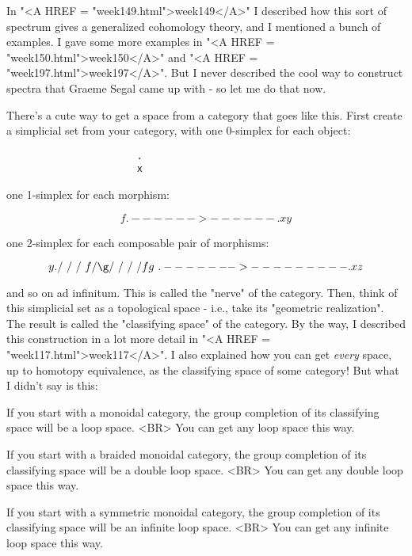 In "<A HREF = "week149.html">week149</A>" I described how this sort of spectrum gives a generalized
cohomology theory, and I mentioned a bunch of examples. I gave some
more examples in "<A HREF = "week150.html">week150</A>" and "<A HREF = "week197.html">week197</A>".  But I never described the
cool way to construct spectra that Graeme Segal came up with - so let
me do that now.

There's a cute way to get a space from a category that goes like this.
First create a simplicial set from your category, with one 0-simplex for
each object:

\begin{verbatim}
                       .
                       x
\end{verbatim}
    
one 1-simplex for each morphism:

$$
                       f
                .------>------.
                x             y
$$
    
one 2-simplex for each composable pair of morphisms:

$$
                       y
                       .
                      / \
                     /   \
                    /     \
                  f/       \g
                  /         \
                 /           \
                /             \
               /      fg       \
              .------->---------.
              x                 z

$$
    
and so on ad infinitum.  This is called the "nerve" of the category.
Then, think of this simplicial set as a topological space - i.e., take
its "geometric realization".  The result is called the "classifying
space" of the category.  By the way, I described this construction in
a lot more detail in "<A HREF = "week117.html">week117</A>".  I also explained how you can get
\emph{every} space, up to homotopy equivalence, as the classifying space of
some category!  But what I didn't say is this:

If you start with a monoidal category, the group completion of 
its classifying space will be a loop space.  <BR>
You can get any loop space this way.

If you start with a braided monoidal category, the group completion of 
its classifying space will be a double loop space.  <BR>
You can get any double loop space this way.

If you start with a symmetric monoidal category, the group completion of
its classifying space will be an infinite loop space.  <BR>
You can get any infinite loop space this way.

